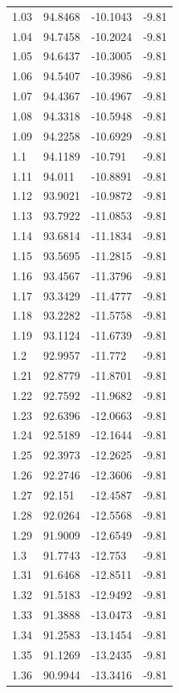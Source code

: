 \begin{tabular}{llll}
1.03 & 94.8468 & -10.1043 & -9.81 \\
1.04 & 94.7458 & -10.2024 & -9.81 \\
1.05 & 94.6437 & -10.3005 & -9.81 \\
1.06 & 94.5407 & -10.3986 & -9.81 \\
1.07 & 94.4367 & -10.4967 & -9.81 \\
1.08 & 94.3318 & -10.5948 & -9.81 \\
1.09 & 94.2258 & -10.6929 & -9.81 \\
1.1 & 94.1189 & -10.791 & -9.81 \\
1.11 & 94.011 & -10.8891 & -9.81 \\
1.12 & 93.9021 & -10.9872 & -9.81 \\
1.13 & 93.7922 & -11.0853 & -9.81 \\
1.14 & 93.6814 & -11.1834 & -9.81 \\
1.15 & 93.5695 & -11.2815 & -9.81 \\
1.16 & 93.4567 & -11.3796 & -9.81 \\
1.17 & 93.3429 & -11.4777 & -9.81 \\
1.18 & 93.2282 & -11.5758 & -9.81 \\
1.19 & 93.1124 & -11.6739 & -9.81 \\
1.2 & 92.9957 & -11.772 & -9.81 \\
1.21 & 92.8779 & -11.8701 & -9.81 \\
1.22 & 92.7592 & -11.9682 & -9.81 \\
1.23 & 92.6396 & -12.0663 & -9.81 \\
1.24 & 92.5189 & -12.1644 & -9.81 \\
1.25 & 92.3973 & -12.2625 & -9.81 \\
1.26 & 92.2746 & -12.3606 & -9.81 \\
1.27 & 92.151 & -12.4587 & -9.81 \\
1.28 & 92.0264 & -12.5568 & -9.81 \\
1.29 & 91.9009 & -12.6549 & -9.81 \\
1.3 & 91.7743 & -12.753 & -9.81 \\
1.31 & 91.6468 & -12.8511 & -9.81 \\
1.32 & 91.5183 & -12.9492 & -9.81 \\
1.33 & 91.3888 & -13.0473 & -9.81 \\
1.34 & 91.2583 & -13.1454 & -9.81 \\
1.35 & 91.1269 & -13.2435 & -9.81 \\
1.36 & 90.9944 & -13.3416 & -9.81 \\

\end{tabular}
